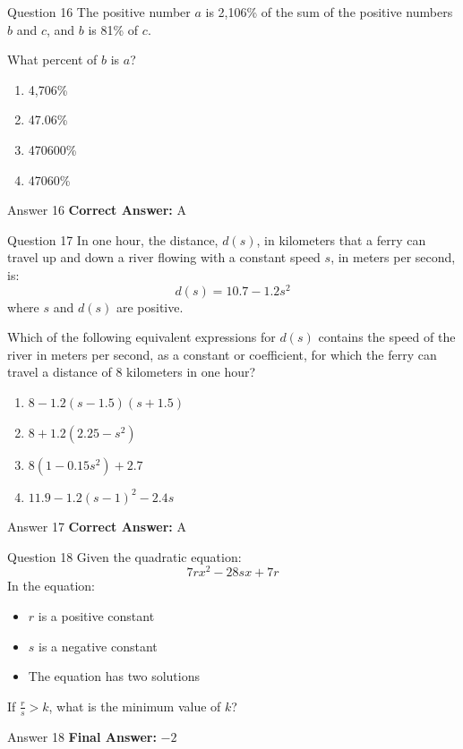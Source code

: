 \documentclass{beamer}
\begin{document}
\begin{frame}{Question 16}
\small
The positive number \(a\) is 2,106\% of the sum of the positive numbers \(b\) and \(c\),  
and \(b\) is 81\% of \(c\).  

What percent of \(b\) is \(a\)?
\vspace{0.35cm}
\begin{enumerate}
    \item[A.] 4,706\%
    \item[B.] 47.06\%
    \item[C.] 470600\%
    \item[D.] 47060\%
\end{enumerate}
\end{frame}
\begin{frame}{Answer 16}
\small
\textbf{Correct Answer:} A
\end{frame}

\begin{frame}{Question 17}
\small
In one hour, the distance, \(d(s)\), in kilometers that a ferry can travel up and down a river  
flowing with a constant speed \(s\), in meters per second, is:  
\[
d(s) = 10.7 - 1.2s^2
\]  
where \(s\) and \(d(s)\) are positive.  

Which of the following equivalent expressions for \(d(s)\) contains the speed  
of the river in meters per second, as a constant or coefficient, for which  
the ferry can travel a distance of 8 kilometers in one hour?
\vspace{0.35cm}
\begin{enumerate}
    \item[A.] \(8 - 1.2(s - 1.5)(s + 1.5)\)
    \item[B.] \(8 + 1.2(2.25 - s^2)\)
    \item[C.] \(8(1 - 0.15s^2) + 2.7\)
    \item[D.] \(11.9 - 1.2(s - 1)^2 - 2.4s\)
\end{enumerate}
\end{frame}
\begin{frame}{Answer 17}
\small
\textbf{Correct Answer:} A
\end{frame}

\begin{frame}{Question 18}
\small
Given the quadratic equation:  
\[
7rx^2 - 28sx + 7r
\]  
In the equation:  
\begin{itemize}
  \item \(r\) is a positive constant  
  \item \(s\) is a negative constant  
  \item The equation has two solutions  
\end{itemize}

If \( \frac{r}{s} > k \), what is the minimum value of \(k\)?
\end{frame}
\begin{frame}{Answer 18}
\small
\textbf{Final Answer:} $\boxed{-2}$
\end{frame}
\end{document}
